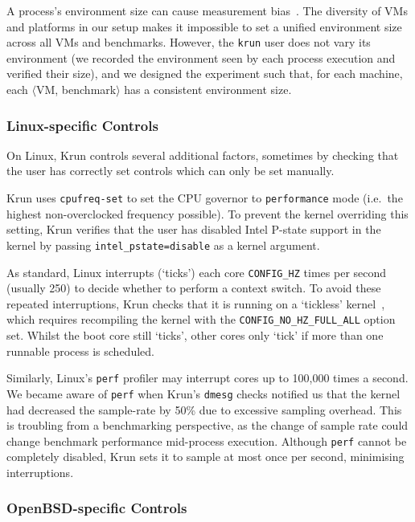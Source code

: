 \documentclass[acmlarge]{acmart}\settopmatter{printfolios=true}
\newcommand{\krun}{Krun\xspace}
\newcommand{\vmbpair}{$\langle$VM, benchmark$\rangle$\xspace}
\begin{document}
A process's environment size can cause measurement
bias~\cite{mytkowicz09surprising}. The diversity of VMs and platforms
in our setup makes it impossible to set a unified environment size across all VMs and
benchmarks. However, the \texttt{krun} user does not
vary its environment (we recorded the environment seen by each process
execution and verified their size), and we designed the experiment such that,
for each machine, each \vmbpair has a consistent environment size.


\subsubsection{Linux-specific Controls}

On Linux, \krun controls several additional factors, sometimes by checking that
the user has correctly set controls which can only be set manually.

\krun uses \texttt{cpufreq-set} to set the CPU governor to \texttt{performance} mode
(i.e.~the highest non-overclocked frequency possible).
To prevent the kernel overriding this setting, \krun verifies that the user has disabled
Intel P-state support in the kernel by passing
\texttt{intel\_pstate=disable} as a kernel argument.

As standard, Linux interrupts (`ticks') each core
\texttt{CONFIG\-\_HZ} times per second (usually 250) to
decide whether to perform a context switch. To avoid these repeated
interruptions, \krun checks that it is running on a `tickless'
kernel~\cite{tickless}, which requires recompiling the kernel with the
\texttt{CONFIG\_NO\_HZ\_FULL\_ALL} option set. Whilst the boot core still
`ticks', other cores only `tick' if more than one runnable process is scheduled.

Similarly, Linux's \texttt{perf} profiler may interrupt cores up to 100,000 times a
second. We became aware of \texttt{perf} when \krun's \texttt{dmesg} checks
notified us that the kernel had decreased the sample-rate by
50\% due to excessive sampling overhead. This is troubling
from a benchmarking perspective, as the change of sample rate could change
benchmark performance mid-process execution. Although
\texttt{perf} cannot be completely disabled, \krun sets it to sample at most
once per second, minimising interruptions.


\subsubsection{OpenBSD-specific Controls}
\end{document}
